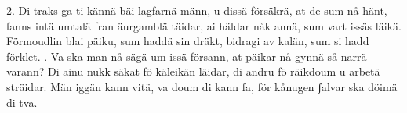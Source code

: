 \setlength{\columnsep}{0.2cm}
\begin{multicols}{2}
2.  Di traks ga ti kännä bäi lagfarnä männ,
    u dissä försäkrä, at de sum nå hänt,
    fanns intä umtalä fran äurgamblä täidar,
    ai häldar nåk annä, sum vart issäs läikä.
    Förmoudlin blai päiku, sum haddä sin dräkt,
    bidragi av kalän, sum si hadd förklet.
\vfill{}.  Va ska man nå sägä um issä försann,
    at päikar nå gynnä så narrä varann?
    Di ainu nukk säkat fö käleikän läidar,
    di andru fö räikdoum u arbetä sträidar.
    Män iggän kann vitä, va doum di kann fa,
    för kånugen ʃalvar ska döimä di tva.
\end{multicols}
